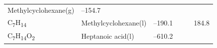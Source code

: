 \documentclass[
  9pt,
]{extbook}
\theoremstyle{definition}
\theoremstyle{definition}
\theoremstyle{definition}
\theoremstyle{remark}
\begin{document}
\begin{longtable}[]{@{}llllll@{}}
\begin{minipage}[t]{0.17\columnwidth}
Methylcyclohexane(g)\strut
\end{minipage} & \begin{minipage}[t]{0.15\columnwidth}\raggedright
--154.7\strut
\end{minipage} & \begin{minipage}[t]{0.15\columnwidth}\raggedright
\strut
\end{minipage} & \begin{minipage}[t]{0.14\columnwidth}\raggedright
\strut
\end{minipage} & \begin{minipage}[t]{0.14\columnwidth}\raggedright
\strut
\end{minipage}\tabularnewline
\begin{minipage}[t]{0.07\columnwidth}\raggedright
C\textsubscript{7}H\textsubscript{14}\strut
\end{minipage} & \begin{minipage}[t]{0.17\columnwidth}\raggedright
Methylcyclohexane(l)\strut
\end{minipage} & \begin{minipage}[t]{0.15\columnwidth}\raggedright
--190.1\strut
\end{minipage} & \begin{minipage}[t]{0.15\columnwidth}\raggedright
\strut
\end{minipage} & \begin{minipage}[t]{0.14\columnwidth}\raggedright
\strut
\end{minipage} & \begin{minipage}[t]{0.14\columnwidth}\raggedright
184.8\strut
\end{minipage}\tabularnewline
\begin{minipage}[t]{0.07\columnwidth}\raggedright
C\textsubscript{7}H\textsubscript{14}O\textsubscript{2}\strut
\end{minipage} & \begin{minipage}[t]{0.17\columnwidth}\raggedright
Heptanoic acid(l)\strut
\end{minipage} & \begin{minipage}[t]{0.15\columnwidth}\raggedright
--610.2\strut
\end{minipage} & \begin{minipage}[t]{0.15\columnwidth}\raggedright
\strut
\end{minipage} & \begin{minipage}[t]{0.14\columnwidth}\raggedright
\strut
\end{minipage} & \begin{minipage}[t]{0.14\columnwidth}\raggedright

\end{minipage}
\end{longtable}
\end{document}
